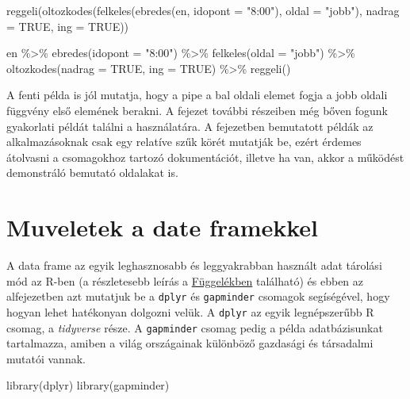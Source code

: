 \documentclass[
]{book}
\newenvironment{Shaded}{\begin{snugshade}}{\end{snugshade}}
\newcommand{\AttributeTok}[1]{\textcolor[rgb]{0.77,0.63,0.00}{#1}}
\newcommand{\ConstantTok}[1]{\textcolor[rgb]{0.00,0.00,0.00}{#1}}
\newcommand{\FunctionTok}[1]{\textcolor[rgb]{0.00,0.00,0.00}{#1}}
\newcommand{\NormalTok}[1]{#1}
\newcommand{\SpecialCharTok}[1]{\textcolor[rgb]{0.00,0.00,0.00}{#1}}
\newcommand{\StringTok}[1]{\textcolor[rgb]{0.31,0.60,0.02}{#1}}
\begin{document}
\begin{Shaded}
\begin{Highlighting}[]
\FunctionTok{reggeli}\NormalTok{(}\FunctionTok{oltozkodes}\NormalTok{(}\FunctionTok{felkeles}\NormalTok{(}\FunctionTok{ebredes}\NormalTok{(en, }\AttributeTok{idopont =} \StringTok{"8:00"}\NormalTok{), }\AttributeTok{oldal =} \StringTok{"jobb"}\NormalTok{), }\AttributeTok{nadrag =} \ConstantTok{TRUE}\NormalTok{, }\AttributeTok{ing =} \ConstantTok{TRUE}\NormalTok{))}

\NormalTok{en }\SpecialCharTok{\%\textgreater{}\%}
  \FunctionTok{ebredes}\NormalTok{(}\AttributeTok{idopont =} \StringTok{"8:00"}\NormalTok{) }\SpecialCharTok{\%\textgreater{}\%}
  \FunctionTok{felkeles}\NormalTok{(}\AttributeTok{oldal =} \StringTok{"jobb"}\NormalTok{) }\SpecialCharTok{\%\textgreater{}\%}
  \FunctionTok{oltozkodes}\NormalTok{(}\AttributeTok{nadrag =} \ConstantTok{TRUE}\NormalTok{, }\AttributeTok{ing =} \ConstantTok{TRUE}\NormalTok{) }\SpecialCharTok{\%\textgreater{}\%}
  \FunctionTok{reggeli}\NormalTok{()}
\end{Highlighting}
\end{Shaded}

A fenti példa is jól mutatja, hogy a pipe a bal oldali elemet fogja a
jobb oldali függvény első elemének berakni. A fejezet további részeiben
még bőven fogunk gyakorlati példát találni a használatára. A fejezetben
bemutatott példák az alkalmazásoknak csak egy relatíve szűk körét
mutatják be, ezért érdemes átolvasni a csomagokhoz tartozó
dokumentációt, illetve ha van, akkor a működést demonstráló bemutató
oldalakat is.

\hypertarget{muveletek-a-date-framekkel}{%
\section{Muveletek a date framekkel}\label{muveletek-a-date-framekkel}}

A data frame az egyik leghasznosabb és leggyakrabban használt adat
tárolási mód az R-ben (a részletesebb leírás a
\protect\hyperlink{data-frame}{Függelékben} található) és ebben az
alfejezetben azt mutatjuk be a \texttt{dplyr} és \texttt{gapminder}
csomagok segíségével, hogy hogyan lehet hatékonyan dolgozni velük. A
\texttt{dplyr} az egyik legnépszerűbb R csomag, a \emph{tidyverse}
része. A \texttt{gapminder} csomag pedig a példa adatbázisunkat
tartalmazza, amiben a világ országainak különböző gazdasági és
társadalmi mutatói vannak.

\begin{Shaded}
\begin{Highlighting}[]
\FunctionTok{library}\NormalTok{(dplyr)}
\FunctionTok{library}\NormalTok{(gapminder)}
\end{Highlighting}
\end{Shaded}
\end{document}
